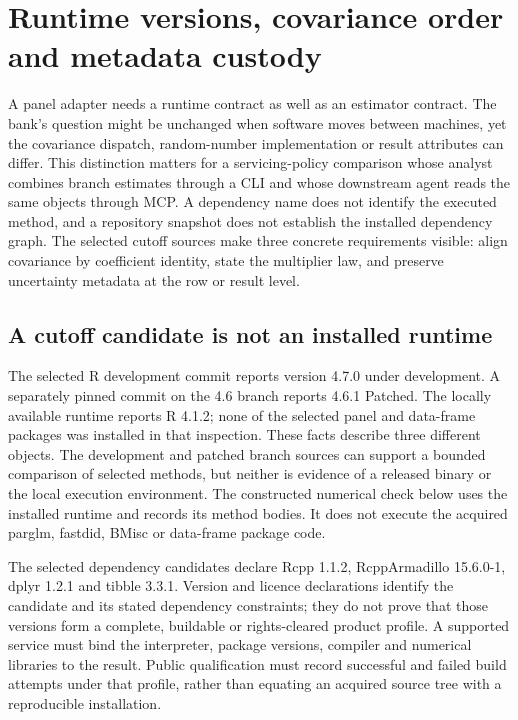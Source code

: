\section{Runtime versions, covariance order and metadata custody}
\label{sec:exec29-panel-runtime-semantics}

A panel adapter needs a runtime contract as well as an estimator contract. The bank's question might be unchanged when software moves between machines, yet the covariance dispatch, random-number implementation or result attributes can differ. This distinction matters for a servicing-policy comparison whose analyst combines branch estimates through a CLI and whose downstream agent reads the same objects through MCP. A dependency name does not identify the executed method, and a repository snapshot does not establish the installed dependency graph. The selected cutoff sources make three concrete requirements visible: align covariance by coefficient identity, state the multiplier law, and preserve uncertainty metadata at the row or result level.\citep{exec29_panel_runtime_sources}

\subsection{A cutoff candidate is not an installed runtime}

The selected R development commit reports version 4.7.0 under development. A separately pinned commit on the 4.6 branch reports 4.6.1 Patched. The locally available runtime reports R 4.1.2; none of the selected panel and data-frame packages was installed in that inspection. These facts describe three different objects. The development and patched branch sources can support a bounded comparison of selected methods, but neither is evidence of a released binary or the local execution environment. The constructed numerical check below uses the installed runtime and records its method bodies. It does not execute the acquired parglm, fastdid, BMisc or data-frame package code.\citep{exec29_panel_runtime_sources,exec29_panel_runtime_reference}

The selected dependency candidates declare Rcpp 1.1.2, RcppArmadillo 15.6.0-1, dplyr 1.2.1 and tibble 3.3.1. Version and licence declarations identify the candidate and its stated dependency constraints; they do not prove that those versions form a complete, buildable or rights-cleared product profile. A supported service must bind the interpreter, package versions, compiler and numerical libraries to the result. Public qualification must record successful and failed build attempts under that profile, rather than equating an acquired source tree with a reproducible installation.\citep{exec29_panel_runtime_sources}

